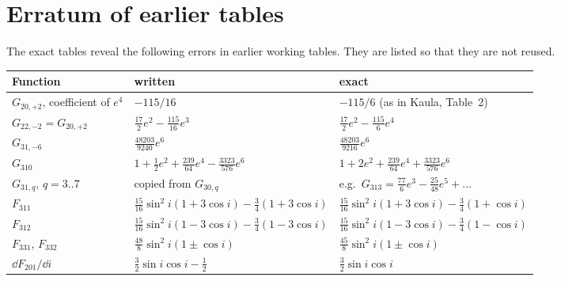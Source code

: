 

\section{Erratum of earlier tables}
The exact tables reveal the following errors in earlier working tables. They are listed so that they are not reused.
\begin{center}\small
\begin{tabular}{lll}\toprule
Function & written & exact\\\midrule
$G_{20,+2}$, coefficient of $e^4$ & $-115/16$ & $-115/6$ (as in Kaula, Table~2)\\
$G_{22,-2}=G_{20,+2}$ & $\tfrac{17}{2}e^2-\tfrac{115}{16}e^3$ & $\tfrac{17}{2}e^2-\tfrac{115}{6}e^4$\\
$G_{31,-6}$ & $\tfrac{48203}{9240}e^6$ & $\tfrac{48203}{9216}e^6$\\
$G_{310}$ & $1+\tfrac12e^2+\tfrac{239}{64}e^4-\tfrac{3323}{576}e^6$ & $1+2e^2+\tfrac{239}{64}e^4+\tfrac{3323}{576}e^6$\\
$G_{31,q}$, $q=3..7$ & copied from $G_{30,q}$ & e.g.\ $G_{313}=\tfrac{77}{6}e^3-\tfrac{25}{48}e^5+\dots$\\
$F_{311}$ & $\tfrac{15}{16}\sin^2i(1+3\cos i)-\tfrac34(1+3\cos i)$ & $\tfrac{15}{16}\sin^2i(1+3\cos i)-\tfrac34(1+\cos i)$\\
$F_{312}$ & $\tfrac{15}{16}\sin^2i(1-3\cos i)-\tfrac34(1-3\cos i)$ & $\tfrac{15}{16}\sin^2i(1-3\cos i)-\tfrac34(1-\cos i)$\\
$F_{331}$, $F_{332}$ & $\tfrac{48}{8}\sin^2i(1\pm\cos i)$ & $\tfrac{45}{8}\sin^2i(1\pm\cos i)$\\
$\dd F_{201}/\dd i$ & $\tfrac32\sin i\cos i-\tfrac12$ & $\tfrac32\sin i\cos i$\\\bottomrule
\end{tabular}
\end{center}
